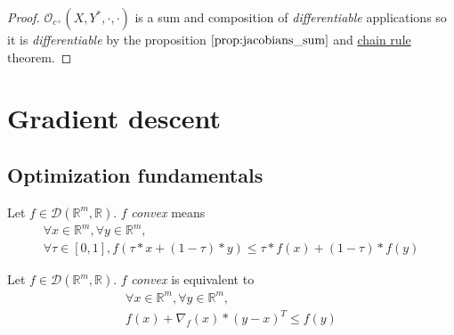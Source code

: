 \documentclass[11pt,en]{elegantpaper}
\newcommand{\Real}{\mathbb{R}}
\begin{document}
\begin{proof}
  $\mathcal{O}_{c^+}(X,Y^*,\cdot,\cdot)$ is a sum and composition of \textit{differentiable} applications so it is \textit{differentiable} by the proposition $\ref{prop:jacobians_sum}$ and \hyperref[theo:chain_rule]{chain rule} theorem. \par
\end{proof}

\section{Gradient descent}

\subsection{Optimization fundamentals}

\begin{definition}
  Let $f \in \mathcal{D}(\Real^m,\Real)$. $f$ \textit{convex} means \begin{equation}\label{def:convex_eq}
    \begin{gathered}
      \forall x \in \Real^m, \forall y \in \Real^m, \\
      \forall \tau \in [0,1], f(\tau * x + (1 - \tau) * y) \leq \tau * f(x) + (1 - \tau) * f(y)
    \end{gathered}
  \end{equation}
\end{definition}

\begin{proposition}
  {\normalfont
    Let $f \in \mathcal{D}(\Real^m,\Real)$. $f$ \textit{convex} is equivalent to \begin{equation}\label{prop:convex_grad}
      \begin{gathered}
        \forall x \in \Real^m, \forall y \in \Real^m, \\
        f(x) + \nabla_f(x) * (y - x)^T \leq f(y)
      \end{gathered}
    \end{equation}
  }
\end{proposition}
\end{document}
